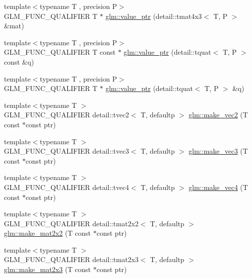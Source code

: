 \begin{DoxyCompactItemize}
\item 
{\footnotesize template$<$typename T , precision P$>$ }\\G\+L\+M\+\_\+\+F\+U\+N\+C\+\_\+\+Q\+U\+A\+L\+I\+F\+I\+ER T $\ast$ \hyperlink{group__gtc__type__ptr_ga4a4b23867cc26441441ff4458844fa27}{glm\+::value\+\_\+ptr} (detail\+::tmat4x3$<$ T, P $>$ \&mat)
\item 
{\footnotesize template$<$typename T , precision P$>$ }\\G\+L\+M\+\_\+\+F\+U\+N\+C\+\_\+\+Q\+U\+A\+L\+I\+F\+I\+ER T const $\ast$ \hyperlink{group__gtc__type__ptr_ga961a5b150a0ffd632aaa0252c4d6b9ab}{glm\+::value\+\_\+ptr} (detail\+::tquat$<$ T, P $>$ const \&q)
\item 
{\footnotesize template$<$typename T , precision P$>$ }\\G\+L\+M\+\_\+\+F\+U\+N\+C\+\_\+\+Q\+U\+A\+L\+I\+F\+I\+ER T $\ast$ \hyperlink{group__gtc__type__ptr_gab72389186ae9e8c822ff6cc9b474a37f}{glm\+::value\+\_\+ptr} (detail\+::tquat$<$ T, P $>$ \&q)
\item 
{\footnotesize template$<$typename T $>$ }\\G\+L\+M\+\_\+\+F\+U\+N\+C\+\_\+\+Q\+U\+A\+L\+I\+F\+I\+ER detail\+::tvec2$<$ T, defaultp $>$ \hyperlink{group__gtc__type__ptr_ga70f570befb4773ba3a658b76f9fdd6ab}{glm\+::make\+\_\+vec2} (T const $\ast$const ptr)
\item 
{\footnotesize template$<$typename T $>$ }\\G\+L\+M\+\_\+\+F\+U\+N\+C\+\_\+\+Q\+U\+A\+L\+I\+F\+I\+ER detail\+::tvec3$<$ T, defaultp $>$ \hyperlink{group__gtc__type__ptr_gad91a6a0fe324630b151208703a1591ed}{glm\+::make\+\_\+vec3} (T const $\ast$const ptr)
\item 
{\footnotesize template$<$typename T $>$ }\\G\+L\+M\+\_\+\+F\+U\+N\+C\+\_\+\+Q\+U\+A\+L\+I\+F\+I\+ER detail\+::tvec4$<$ T, defaultp $>$ \hyperlink{group__gtc__type__ptr_ga1b9e0d9ca48d79ba87edc121c1872c44}{glm\+::make\+\_\+vec4} (T const $\ast$const ptr)
\item 
{\footnotesize template$<$typename T $>$ }\\G\+L\+M\+\_\+\+F\+U\+N\+C\+\_\+\+Q\+U\+A\+L\+I\+F\+I\+ER detail\+::tmat2x2$<$ T, defaultp $>$ \hyperlink{group__gtc__type__ptr_ga860d529f631ea6f9a0e510491d29a8ac}{glm\+::make\+\_\+mat2x2} (T const $\ast$const ptr)
\item 
{\footnotesize template$<$typename T $>$ }\\G\+L\+M\+\_\+\+F\+U\+N\+C\+\_\+\+Q\+U\+A\+L\+I\+F\+I\+ER detail\+::tmat2x3$<$ T, defaultp $>$ \hyperlink{group__gtc__type__ptr_gadef48cd950566f23a4b1e47127ee478c}{glm\+::make\+\_\+mat2x3} (T const $\ast$const ptr)

\end{DoxyCompactItemize}
